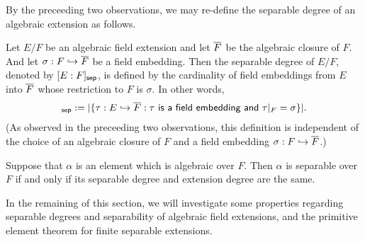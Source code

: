 By the preceeding two observations, we may re-define the separable degree of an algebraic extension as follows.
\begin{defi}
    Let $E/F$ be an algebraic field extension and let $\overline{F}$ be the algebraic closure of $F$.
    And let $\sigma: F\hookrightarrow\overline{F}$ be a field embedding.
    Then the separable degree of $E/F$, denoted by $[E:F]_{\textsf{sep}}$, is defined by the cardinality of field embeddings from $E$ into $\overline{F}$ whose restriction to $F$ is $\sigma$.
    In other words,
    \begin{align*}
        [E:F]_\sep:=|\{\tau: E\hookrightarrow\ol F: \textsf{$\tau$ is a field embedding and $\tau|_F=\sigma$}\}|.
    \end{align*}
    (As observed in the preceeding two observations, this definition is independent of the choice of an algebraic closure of $F$ and a field embedding $\sigma: F\hookrightarrow\overline{F}$.)
\end{defi}
\begin{rmk}
    Suppose that $\alpha$ is an element which is algebraic over $F$.
    Then $\alpha$ is separable over $F$ if and only if its separable degree and extension degree are the same.
\end{rmk}

In the remaining of this section, we will investigate some properties regarding separable degrees and separability of algebraic field extensions, and the primitive element theorem for finite separable extensions.

